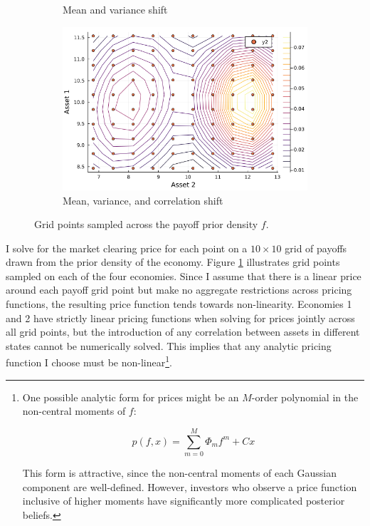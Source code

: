 \documentclass{article}
\begin{document}
\begin{figure}
\begin{subfigure}{0.45\textwidth}
        \caption{Mean and variance shift}
    \end{subfigure}
    \begin{subfigure}{0.45\textwidth}
        \includegraphics[width=\textwidth]{../plots/params/more-corr-meanvarshift/prior-grid.png}
        \caption{Mean, variance, and correlation shift}
    \end{subfigure}
    \caption{Grid points sampled across the payoff prior density $f$.}
    \label{fig:prior-grid}
\end{figure}


I solve for the market clearing price for each point on a $10 \times 10$ grid of payoffs drawn from the prior density of the economy. Figure \ref{fig:prior-grid} illustrates grid points sampled on each of the four economies. Since I assume that there is a linear price around each payoff grid point but make no aggregate restrictions across pricing functions, the resulting price function tends towards non-linearity. Economies 1 and 2 have strictly linear pricing functions when solving for prices jointly across all grid points, but the introduction of any correlation between assets in different states cannot be numerically solved. This implies that any analytic pricing function I choose must be non-linear\footnote{One possible analytic form for prices might be an $M$-order polynomial in the non-central moments of $f$:

$$
p(f, x) = \sum_{m=0}^M \Phi_m f^m + C x 
$$

This form is attractive, since the non-central moments of each Gaussian component are well-defined. However, investors who observe a price function inclusive of higher moments have significantly more complicated posterior beliefs.
}.
\end{document}
